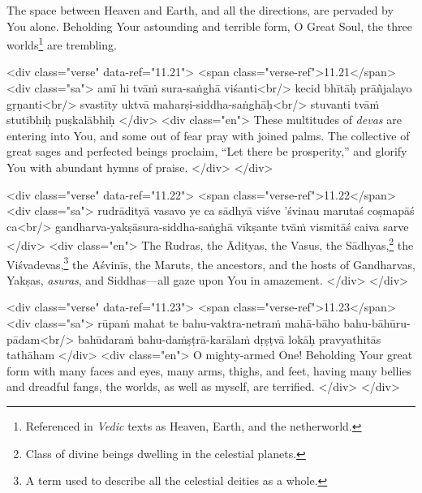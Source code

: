 {The space between Heaven and Earth, and all the directions, are pervaded by You alone. Beholding Your astounding and terrible form, O Great Soul, the three worlds\footnote{Referenced in \textit{Vedic} texts as Heaven, Earth, and the netherworld.} are trembling.}


\begin{html}
<div class="verse" data-ref="11.21">
  <span class="verse-ref">11.21</span>
  <div class="sa">
    amī hi tvāṁ sura-saṅghā viśanti<br/>
    kecid bhītāḥ prāñjalayo gṛṇanti<br/>
    svastīty uktvā maharṣi-siddha-saṅghāḥ<br/>
    stuvanti tvāṁ stutibhiḥ puṣkalābhiḥ
  </div>
  <div class="en">
    These multitudes of \textit{devas} are entering into You, and some out of fear pray with joined palms. The collective of great sages and perfected beings proclaim, \enquote{Let there be prosperity,} and glorify You with abundant hymns of praise.
  </div>
</div>
\end{html}



\begin{html}
<div class="verse" data-ref="11.22">
  <span class="verse-ref">11.22</span>
  <div class="sa">
    rudrādityā vasavo ye ca sādhyā viśve ’śvinau marutaś coṣmapāś ca<br/>
    gandharva-yakṣāsura-siddha-saṅghā vīkṣante tvāṁ vismitāś caiva sarve
  </div>
  <div class="en">
    The Rudras, the Ādityas, the Vasus, the Sādhyas,\footnote{Class of divine beings dwelling in the celestial planets.} the Viśvadevas,\footnote{A term used to describe all the celestial deities as a whole.} the Aśvinīs, the Maruts, the ancestors, and the hosts of Gandharvas, Yakṣas, \textit{asuras}, and Siddhas---all gaze upon You in amazement.
  </div>
</div>
\end{html}



\begin{html}
<div class="verse" data-ref="11.23">
  <span class="verse-ref">11.23</span>
  <div class="sa">
    rūpaṁ mahat te bahu-vaktra-netraṁ mahā-bāho bahu-bāhūru-pādam<br/>
    bahūdaraṁ bahu-daṁṣṭrā-karālaṁ dṛṣṭvā lokāḥ pravyathitās tathāham
  </div>
  <div class="en">
    O mighty-armed One! Beholding Your great form with many faces and eyes, many arms, thighs, and feet, having many bellies and dreadful fangs, the worlds, as well as myself, are terrified.
  </div>
</div>
\end{html}



